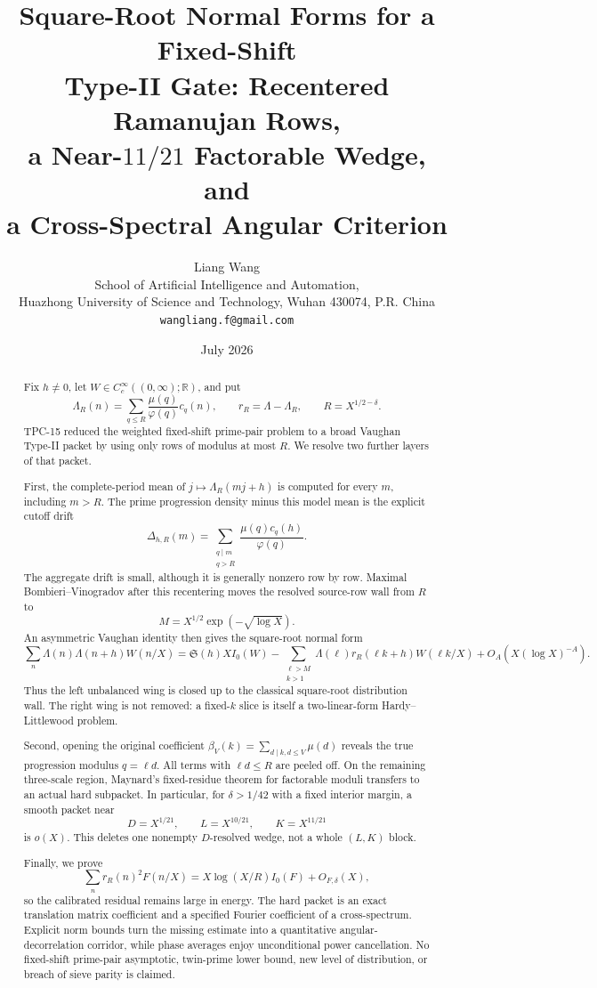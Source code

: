 \documentclass[11pt]{article}
\title{\textbf{Square-Root Normal Forms for a Fixed-Shift}\\
\textbf{Type-II Gate: Recentered Ramanujan Rows,}\\
\textbf{a Near-\texorpdfstring{$11/21$}{11/21} Factorable Wedge, and}\\
\textbf{a Cross-Spectral Angular Criterion}}
\author{Liang Wang\\
\small School of Artificial Intelligence and Automation,\\[-0.2em]
\small Huazhong University of Science and Technology, Wuhan 430074, P.R. China\\
\small \texttt{wangliang.f@gmail.com}}
\date{July 2026}
\theoremstyle{definition}
\theoremstyle{remark}
\newcommand{\R}{\mathbb R}
\begin{document}
\maketitle

\begin{abstract}
Fix $h\ne0$, let $W\in C_c^\infty((0,\infty);\R)$, and put
\[
 \Lambda_R(n)=\sum_{q\le R}\frac{\mu(q)}{\varphi(q)}c_q(n),
 \qquad r_R=\Lambda-\Lambda_R,
 \qquad R=X^{1/2-\delta}.
\]
TPC-15 reduced the weighted fixed-shift prime-pair problem to a broad
Vaughan Type-II packet by using only rows of modulus at most $R$.  We
resolve two further layers of that packet.

First, the complete-period mean of $j\mapsto\Lambda_R(mj+h)$ is computed
for every $m$, including $m>R$.  The prime progression density minus this
model mean is the explicit cutoff drift
\[
 \Delta_{h,R}(m)=
 \sum_{\substack{q\mid m\\q>R}}
 \frac{\mu(q)c_q(h)}{\varphi(q)}.
\]
The aggregate drift is small, although it is generally nonzero row by
row.  Maximal Bombieri--Vinogradov after this recentering moves the
resolved source-row wall from $R$ to
\[
 M=X^{1/2}\exp(-\sqrt{\log X}).
\]
An asymmetric Vaughan identity then gives the square-root normal form
\[
 \sum_n\Lambda(n)\Lambda(n+h)W(n/X)
 =\mathfrak S(h)XI_0(W)-
 \sum_{\substack{\ell>M\\k>1}}
 \Lambda(\ell)r_R(\ell k+h)W(\ell k/X)
 +O_A(X(\log X)^{-A}).
\]
Thus the left unbalanced wing is closed up to the classical square-root
distribution wall.  The right wing is not removed: a fixed-$k$ slice is
itself a two-linear-form Hardy--Littlewood problem.

Second, opening the original coefficient
$\beta_V(k)=\sum_{d\mid k,d\le V}\mu(d)$ reveals the true progression
modulus $q=\ell d$.  All terms with $\ell d\le R$ are peeled off.  On the
remaining three-scale region, Maynard's fixed-residue theorem for
factorable moduli transfers to an actual hard subpacket.  In particular,
for $\delta>1/42$ with a fixed interior margin, a smooth packet near
\[
 D=X^{1/21},\qquad L=X^{10/21},\qquad K=X^{11/21}
\]
is $o(X)$.  This deletes one nonempty $D$-resolved wedge, not a whole
$(L,K)$ block.

Finally, we prove
\[
 \sum_n r_R(n)^2F(n/X)
 =X\log(X/R)I_0(F)+O_{F,\delta}(X),
\]
so the calibrated residual remains large in energy.  The hard packet is
an exact translation matrix coefficient and a specified Fourier
coefficient of a cross-spectrum.  Explicit norm bounds turn the missing
estimate into a quantitative angular-decorrelation corridor, while phase
averages enjoy unconditional power cancellation.  No fixed-shift
prime-pair asymptotic, twin-prime lower bound, new level of distribution,
or breach of sieve parity is claimed.
\end{abstract}
\end{document}
